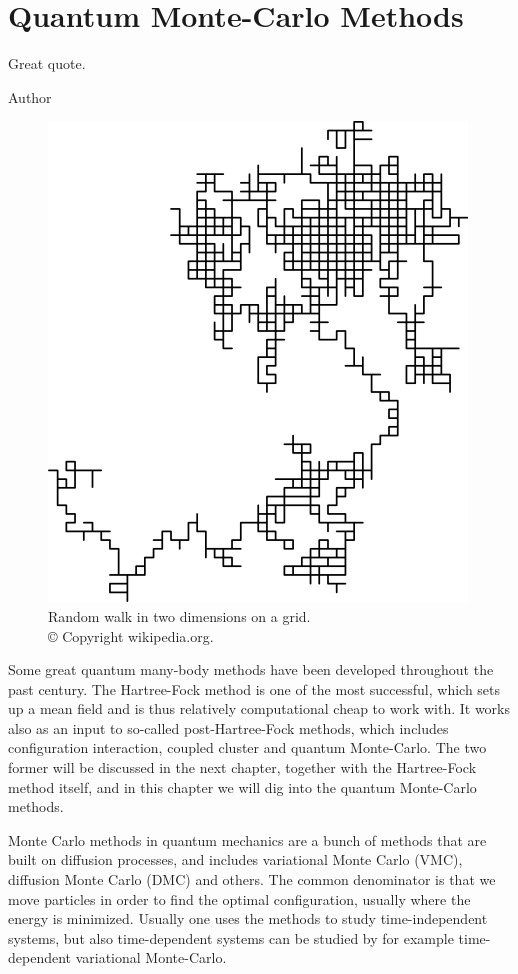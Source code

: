 \chapter{Quantum Monte-Carlo Methods} \label{chp:methods}
\epigraph{Great quote.}{Author}
\begin{figure}[H]
	\centering
	\includegraphics[scale=0.4]{Images/random_walk.png}
	\caption{Random walk in two dimensions on a grid.\\ © Copyright wikipedia.org.}
\end{figure}

Some great quantum many-body methods have been developed throughout the past century. The Hartree-Fock method is one of the most successful, which sets up a mean field and is thus relatively computational cheap to work with. It works also as an input to so-called post-Hartree-Fock methods, which includes configuration interaction, coupled cluster and quantum Monte-Carlo. The two former will be discussed in the next chapter, together with the Hartree-Fock method itself, and in this chapter we will dig into the quantum Monte-Carlo methods. 

Monte Carlo methods in quantum mechanics are a bunch of methods that are built on diffusion processes, and includes variational Monte Carlo (VMC), diffusion Monte Carlo (DMC) and others. The common denominator is that we move particles in order to find the optimal configuration, usually where the energy is minimized. Usually one uses the methods to study time-independent systems, but also time-dependent systems can be studied by for example time-dependent variational Monte-Carlo.

